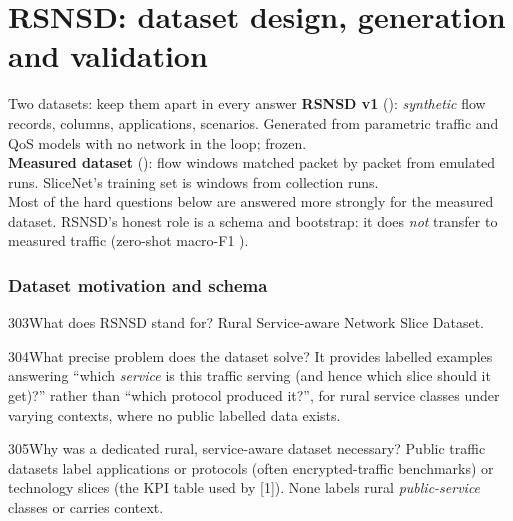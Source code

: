 \part{RSNSD: dataset design, generation and validation}

\begin{keybox}{Two datasets: keep them apart in every answer}
\textbf{RSNSD v1} (): \NRsnsdRows{} \emph{synthetic} flow records, \NRsnsdCols{} columns, \NRsnsdApps{}
applications, \NRsnsdScenarios{} scenarios. Generated from parametric traffic and QoS models with no network in the
loop; frozen.\\
\textbf{Measured dataset} (): flow windows matched packet by packet from emulated
runs. SliceNet's training set is \NSnRows{} windows from \NSnRunsCount{} collection runs.\\
Most of the hard questions below are answered more strongly for the measured dataset. RSNSD's honest role is a schema
and bootstrap: it does \emph{not} transfer to measured traffic (zero-shot macro-F1 \NTrZero).
\end{keybox}

\section{Dataset motivation and schema}

\begin{qa}{303}{What does RSNSD stand for?}
Rural Service-aware Network Slice Dataset.
\end{qa}

\begin{qa}{304}{What precise problem does the dataset solve?}
It provides labelled examples answering ``which \emph{service} is this traffic serving (and hence which slice should
it get)?'' rather than ``which protocol produced it?'', for rural service classes under varying contexts, where no
public labelled data exists.
\end{qa}

\begin{qa}{305}{Why was a dedicated rural, service-aware dataset necessary?}
Public traffic datasets label applications or protocols (often encrypted-traffic benchmarks) or technology slices (the
KPI table used by [1]). None labels rural \emph{public-service} classes or carries context.
\end{qa}

